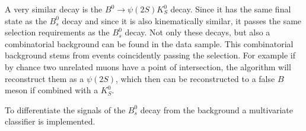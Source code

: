 A very similar decay is the $B^0 \rightarrow \psi(2S)K^0_S$ decay. Since it has the same final state as the $B^0_s$ decay and since it is also kinematically similar, it passes the same selection requirements as the $B^0_s$ decay.
Not only these decays, but also a combinatorial background can be found in the data sample. This combinatorial background stems from events coincidently passing the selection. For example if by chance two unrelated muons have a point of intersection, the algorithm will reconstruct them as a $\psi(2S)$, which then can be reconstructed to a false $B$ meson if combined with a $K^0_S$.

To differentiate the signals of the $B^0_s$ decay from the background a multivariate classifier is implemented.
